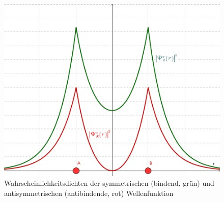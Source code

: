 \begin{figure}[H]
\begin{minipage}[b]{.4\linewidth}
      \includegraphics[width=\linewidth]{resources/16-03-2012/Wahrscheinlichkeitsdichten.jpeg}
      \caption{Wahrscheinlichkeitsdichten der symmetrischen (bindend, grün) und antisymmetrischen (antibindende, rot) Wellenfunktion}
   \end{minipage}
\end{figure}
\label{q:43}
